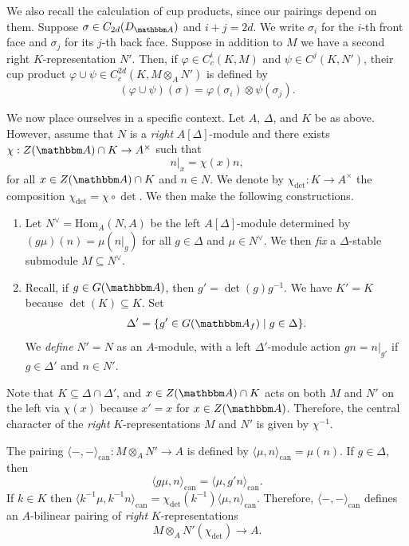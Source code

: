 \documentclass[10pt, twoside]{amsart}
\theoremstyle{plain}
\theoremstyle{definition}
\theoremstyle{remark}
\numberwithin{equation}{subsection}
\def\A{\mathbbm A}
\def\Hom{\mathrm{Hom}}
\def\can{\mathrm{can}}
\def\can{\mathrm{can}}
\begin{document}
\begin{appendix}
We also recall the calculation of cup products, since our pairings depend on them. Suppose $\sigma \in C_{2d}(D_{\A})$ and $i + j = 2d$. We write $\sigma_i$ for the $i$-th front face and $\sigma_j$ for its $j$-th back face. Suppose in addition to $M$ we have a second right $K$-representation $N'$. Then, if $\varphi \in C^i_c(K,M)$ and $\psi \in C^j(K,N')$, their cup product $\varphi \cup \psi \in C^{2d}_c(K,M\otimes_A N')$ is defined by
$$
(\varphi \cup \psi)(\sigma) = \varphi(\sigma_i) \otimes \psi(\sigma_j).
$$

We now place ourselves in a specific context. Let $A$, $\Delta$, and $K$ be as above. However, assume that $N$ is a {\em right} $A[\Delta]$-module and there exists $\chi:  Z(\A) \cap K \rightarrow A^\times$ such that 
\begin{equation}\label{eqn:app-chi}
n|_x = \chi(x)n,
\end{equation}
for all $x \in Z(\A) \cap K$ and $n \in N$. We denote by $\chi_{\det} : K \rightarrow A^\times$ the composition $\chi_{\det} = \chi \circ \det$. We then make the following constructions.

\begin{enumerate}[label=(\arabic*)]
\item Let $N^\vee = \Hom_A(N,A)$ be the left $A[\Delta]$-module determined by $(g\mu)(n) = \mu(n|_g)$ for all $g \in \Delta$ and $\mu \in  N^\vee$. We then {\em fix} a $\Delta$-stable submodule $M \subseteq N^\vee$.\label{enum-part:M-definition}
\item Recall, if $g \in G(\A)$, then $g'  = \det(g)g^{-1}$. We have $K' = K$ because $\det(K) \subseteq K$. Set 
$$
\Delta' = \{g' \in G(\A_f) \mid g \in \Delta\}.
$$ 
We {\em define} $N'=N$ as an $A$-module, with a left $\Delta'$-module action $gn = n|_{g'}$ if $g \in \Delta'$ and $n \in N'$.\label{enum-part:Nprime-definition}
\end{enumerate}
Note that $K \subseteq \Delta \cap \Delta'$, and $x \in Z(\A) \cap K$ acts on both $M$ and $N'$ on the left via $\chi(x)$ because $x' = x$ for $x \in Z(\A)$. Therefore, the central character of the {\em right} $K$-representations $M$ and $N'$ is given by $\chi^{-1}$.

The pairing $\langle - , - \rangle_{\can} : M\otimes_A N' \rightarrow A$ is defined by $\langle \mu ,n \rangle_{\can} = \mu(n)$. If $g \in \Delta$, then
\begin{equation}\label{eqn:pairing-adjoint}
\langle g \mu, n \rangle_{\can} = \langle \mu, g'n \rangle_{\can}.
\end{equation}
If $k \in K$ then $\langle k^{-1}\mu,k^{-1}n\rangle_{\can} = \chi_{\det}(k^{-1}) \langle \mu,n \rangle_{\can}$. Therefore, $\langle - , - \rangle_{\can}$ defines an $A$-bilinear pairing of {\em right} $K$-representations
\begin{equation}\label{eqn:canonical-pairing-app}
M \otimes_A N'(\chi_{\det}) \rightarrow A.
\end{equation}


\end{appendix}
\end{document}
